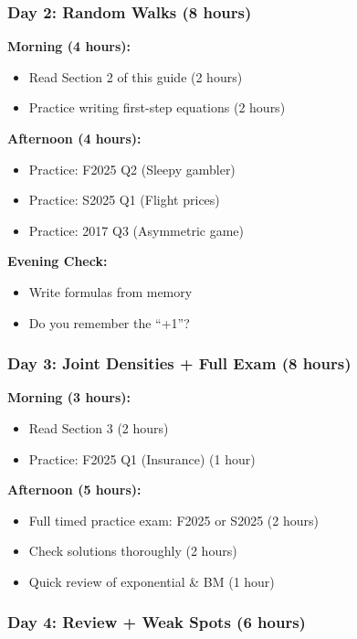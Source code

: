 \documentclass[10pt,letterpaper]{article}
\begin{document}
\subsubsection{Day 2: Random Walks (8 hours)}

\textbf{Morning (4 hours):}
\begin{itemize}
  \item Read Section 2 of this guide (2 hours)
  \item Practice writing first-step equations (2 hours)
\end{itemize}

\textbf{Afternoon (4 hours):}
\begin{itemize}
  \item Practice: F2025 Q2 (Sleepy gambler)
  \item Practice: S2025 Q1 (Flight prices)
  \item Practice: 2017 Q3 (Asymmetric game)
\end{itemize}

\textbf{Evening Check:}
\begin{itemize}
  \item Write formulas from memory
  \item Do you remember the ``+1''?
\end{itemize}

\subsubsection{Day 3: Joint Densities + Full Exam (8 hours)}

\textbf{Morning (3 hours):}
\begin{itemize}
  \item Read Section 3 (2 hours)
  \item Practice: F2025 Q1 (Insurance) (1 hour)
\end{itemize}

\textbf{Afternoon (5 hours):}
\begin{itemize}
  \item Full timed practice exam: F2025 or S2025 (2 hours)
  \item Check solutions thoroughly (2 hours)
  \item Quick review of exponential \& BM (1 hour)
\end{itemize}

\subsubsection{Day 4: Review + Weak Spots (6 hours)}
\end{document}
